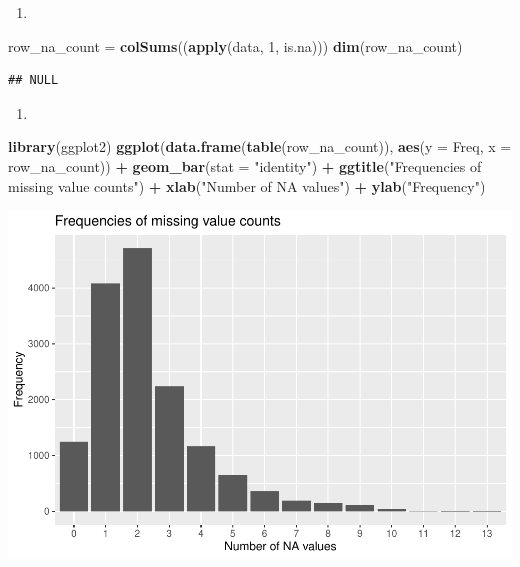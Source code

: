 \documentclass[
]{article}
\newenvironment{Shaded}{\begin{snugshade}}{\end{snugshade}}
\newcommand{\DataTypeTok}[1]{\textcolor[rgb]{0.13,0.29,0.53}{#1}}
\newcommand{\DecValTok}[1]{\textcolor[rgb]{0.00,0.00,0.81}{#1}}
\newcommand{\KeywordTok}[1]{\textcolor[rgb]{0.13,0.29,0.53}{\textbf{#1}}}
\newcommand{\NormalTok}[1]{#1}
\newcommand{\OperatorTok}[1]{\textcolor[rgb]{0.81,0.36,0.00}{\textbf{#1}}}
\newcommand{\StringTok}[1]{\textcolor[rgb]{0.31,0.60,0.02}{#1}}
\providecommand{\tightlist}{%
  \setlength{\itemsep}{0pt}\setlength{\parskip}{0pt}}
\begin{document}
\begin{enumerate}
\def\labelenumi{\arabic{enumi}.}
\tightlist
\item
\end{enumerate}

\begin{Shaded}
\begin{Highlighting}[]
\NormalTok{row\_na\_count =}\StringTok{ }\KeywordTok{colSums}\NormalTok{((}\KeywordTok{apply}\NormalTok{(data, }\DecValTok{1}\NormalTok{, is.na)))}
\KeywordTok{dim}\NormalTok{(row\_na\_count)}
\end{Highlighting}
\end{Shaded}

\begin{verbatim}
## NULL
\end{verbatim}

\begin{enumerate}
\def\labelenumi{\arabic{enumi}.}
\setcounter{enumi}{1}
\tightlist
\item
\end{enumerate}

\begin{Shaded}
\begin{Highlighting}[]
\KeywordTok{library}\NormalTok{(ggplot2)}
\KeywordTok{ggplot}\NormalTok{(}\KeywordTok{data.frame}\NormalTok{(}\KeywordTok{table}\NormalTok{(row\_na\_count)), }\KeywordTok{aes}\NormalTok{(}\DataTypeTok{y =}\NormalTok{ Freq, }\DataTypeTok{x =}\NormalTok{ row\_na\_count)) }\OperatorTok{+}
\KeywordTok{geom\_bar}\NormalTok{(}\DataTypeTok{stat =} \StringTok{"identity"}\NormalTok{) }\OperatorTok{+}
\KeywordTok{ggtitle}\NormalTok{(}\StringTok{"Frequencies of missing value counts"}\NormalTok{) }\OperatorTok{+}
\KeywordTok{xlab}\NormalTok{(}\StringTok{"Number of NA values"}\NormalTok{) }\OperatorTok{+}\StringTok{ }\KeywordTok{ylab}\NormalTok{(}\StringTok{"Frequency"}\NormalTok{)}
\end{Highlighting}
\end{Shaded}

\includegraphics{hw3_files/figure-latex/unnamed-chunk-5-1.pdf}
\end{document}
